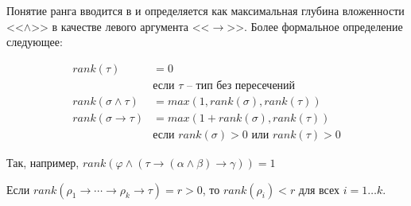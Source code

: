 \documentclass[../main.tex]{subfiles}
\begin{document}
Понятие ранга вводится в \cite{leivant_1983} и определяется как максимальная глубина вложенности <<$\wedge$>> в качестве левого аргумента <<$\to$>>. Более формальное определение следующее:

\begin{definition}

\begin{align*}
    rank(\tau) &= 0 \\
               & \text{если $\tau$ -- тип без пересечений}\\
    rank(\sigma \wedge \tau) &= max(1, rank(\sigma), rank(\tau))\\
    rank(\sigma \to \tau) &= max(1 + rank(\sigma), rank(\tau))\\
               & \text{если $rank(\sigma) > 0$ или $rank(\tau) > 0$}
\end{align*}

\end{definition}

Так, например, $rank(\varphi \wedge (\tau \to (\alpha \wedge \beta) \to \gamma)) = 1$

\begin{lemma}\label{arrow rank}
Если $rank(\rho_1 \to \cdots \to \rho_k \to \tau) = r > 0$, то $rank(\rho_i) < r$ для всех $i = 1 \dots k$.
\end{lemma}
\end{document}
